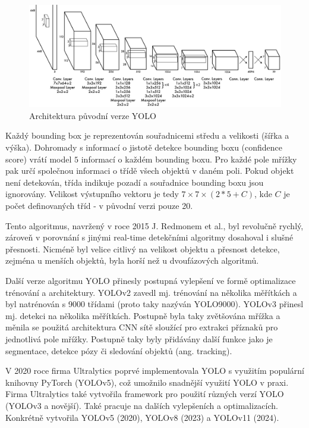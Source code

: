 \begin{figure}[]
    \centering
    \includegraphics[width=\textwidth]{Figures/yolo}
    \caption{Architektura původní verze YOLO \cite{yolo}}
    \label{fig:yolo}
\end{figure}

Každý bounding box je reprezentován souřadnicemi středu a velikosti (šířka a
výška). Dohromady s informací o jistotě detekce bounding boxu (confidence
score) vrátí model $5$ informací o každém bounding boxu. Pro každé pole mřížky
pak určí společnou informaci o třídě všech objektů v daném poli. Pokud objekt
není detekován, třída indikuje pozadí a souřadnice bounding boxu jsou
ignorovány. Velikost výstupního vektoru je tedy $7 \times 7 \times (2 * 5 +
    C)$, kde $C$ je počet definovaných tříd - v původní verzi pouze 20.

Tento algoritmus, navržený v roce 2015 J. Redmonem et al., byl revolučně
rychlý, zároveň v porovnání s jinými real-time detekčními algoritmy dosahoval i
slušné přesnosti. Nicméně byl velice citlivý na velikost objektu a přesnost
detekce, zejména u menších objektů, byla horší než u dvoufázových algoritmů.

Další verze algoritmu YOLO přinesly postupná vylepšení ve formě optimalizace
trénování a architektury. YOLOv2 \cite{yolo9000} zavedl mj. trénování na
několika měřítkách a byl natrénován s 9000 třídami (proto taky nazýván
YOLO9000). YOLOv3 \cite{yolov3} přinesl mj. detekci na několika měřítkách.
Postupně byla taky zvětšována mřížka a měnila se použitá architektura CNN sítě
sloužící pro extrakci příznaků pro jednotlivá pole mřížky. Postupně taky byly
přidávány další funkce jako je segmentace, detekce pózy či sledování objektů
(ang. tracking).

V 2020 roce firma Ultralytics poprvé implementovala YOLO s využitím populární
knihovny PyTorch (YOLOv5), což umožnilo snadnější využití YOLO v praxi. Firma
Ultralytics také vytvořila framework pro použití různých verzí YOLO (YOLOv3 a
novější). Také pracuje na dalších vylepšeních a optimalizacích. Konkrétně
vytvořila YOLOv5 (2020), YOLOv8 (2023) a YOLOv11 (2024).

